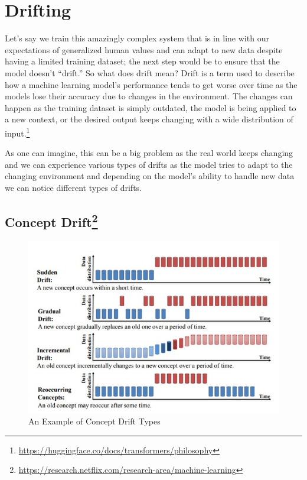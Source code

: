\documentclass[
]{book}
\begin{document}
\hypertarget{drifting}{%
\section{Drifting}\label{drifting}}

Let's say we train this amazingly complex system that is in line with our expectations of generalized human values and can adapt to new data despite having a limited training dataset; the next step would be to ensure that the model doesn't ``drift.'' So what does drift mean? Drift is a term used to describe how a machine learning model's performance tends to get worse over time as the models lose their accuracy due to changes in the environment. The changes can happen as the training dataset is simply outdated, the model is being applied to a new context, or the desired output keeps changing with a wide distribution of input.\footnote{\url{https://huggingface.co/docs/transformers/philosophy}}

As one can imagine, this can be a big problem as the real world keeps changing and we can experience various types of drifts as the model tries to adapt to the changing environment and depending on the model's ability to handle new data we can notice different types of drifts.

\hypertarget{concept-drift5}{%
\subsection[Concept Drift]{\texorpdfstring{Concept Drift\footnote{\url{https://research.netflix.com/research-area/machine-learning}}}{Concept Drift}}\label{concept-drift5}}

\begin{figure}
\centering
\includegraphics{figures/figure6.png}
\caption{An Example of Concept Drift Types}
\end{figure}
\end{document}
